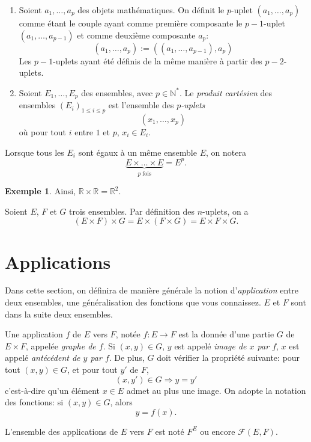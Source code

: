 \documentclass[11pt]{article}
\newcommand{\N}{\mathbb N}
\newcommand{\R}{\mathbb R}
\theoremstyle{definition}
\newtheorem{exe}{Exemple}
\theoremstyle{remark}
\theoremstyle{theorem}
\begin{document}
\begin{defn}[Généralisation]\leavevmode
	\begin{enumerate}
		\item Soient $a_1,\ldots,a_p$ des objets mathématiques. On définit le $p$-uplet $(a_1,\ldots,a_p)$ comme étant le couple ayant comme première composante le $p-1$-uplet $(a_1,\ldots,a_{p-1})$ et comme deuxième composante $a_p$:
		\[
		(a_1,\ldots,a_p) := \left((a_1,\ldots,a_{p-1}),a_p\right)
		\]
		 Les $p-1$-uplets ayant été définis de la même manière à partir des $p-2$-uplets.
		\item Soient $E_1,\ldots,E_p$ des ensembles, avec $p\in\N^*$. Le \textit{produit cartésien} des ensembles $(E_i)_{1\leq i\leq p}$ est l'ensemble des \textit{$p$-uplets}
		\[ (x_1,\ldots,x_p)
		\]
		où pour tout $i$ entre $1$ et $p$, $x_i\in E_i$.
	\end{enumerate}
\end{defn}

Lorsque tous les $E_i$ sont égaux à un même ensemble $E$, on notera
\[
\underbrace{E\times\ldots \times E}_{p\; \text{fois}} = E^p.
\]

\begin{exe}
	Ainsi, $\R\times\R = \R^2$.
\end{exe}

\begin{prop}
	Soient $E$, $F$ et $G$ trois ensembles. Par définition des $n$-uplets, on a 
	\[(E\times F)\times G = E\times(F\times G) = E\times F\times G. \]
\end{prop}


\section{Applications}

Dans cette section, on définira de manière générale la notion d'\textit{application} entre deux ensembles, une généralisation des fonctions que vous connaissez. $E$ et $F$ sont dans la suite deux ensembles.


\begin{defn}
	Une application $f$ de $E$ vers $F$, notée $f:E\longrightarrow F$ est la donnée d'une partie $G$ de $E\times F$, appelée \textit{graphe de $f$}. Si $(x,y)\in G$, $y$ est appelé \textit{image de $x$ par $f$}, $x$ est appelé \textit{antécédent de $y$ par $f$}. De plus, $G$ doit vérifier la propriété suivante:
	pour tout $(x,y)\in G$, et pour tout $y'$ de $F$,
	\[
	(x,y')\in G \Rightarrow y=y'
	\]
	c'est-à-dire qu'un élément $x\in E$ admet au plus une image. On adopte la notation des fonctions: si $(x,y)\in G$, alors
	\[y=f(x).\]
	
	L'ensemble des applications de $E$ vers $F$ est noté $F^E$ ou encore \(\mathcal{F}(E,F)\).
\end{defn}
\end{document}

